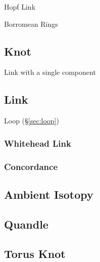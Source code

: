 Hopf Link

Borromean Rings



\subsection{Knot} \label{sec:knot}

Link with a single component %



\subsection{Link} \label{sec:link}

Loop (\S\ref{sec:loop})



\subsubsection{Whitehead Link} \label{sec:whitehead_link}

\subsubsection{Concordance} \label{sec:concordance}



\subsection{Ambient Isotopy} \label{sec:ambient_isotopy}

\subsection{Quandle} \label{sec:quandle}

\subsection{Torus Knot} \label{sec:torus_knot}



